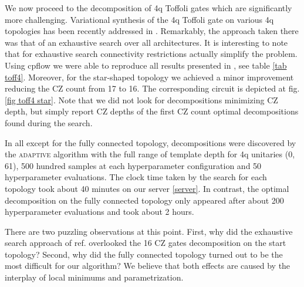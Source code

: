\documentclass[draft, amsfonts, amssymb, aps, nofootinbib, twocolumn]{revtex4-2}
\newcommand{\CZ}{CZ }
\newcommand{\cpflow}{\textrm {cpflow }}
\newcommand{\adaptive}{\textsc{adaptive }}
\begin{document}
We now proceed to the decomposition of 4q Toffoli gates which are significantly more challenging. Variational synthesis of the 4q Toffoli gate on various 4q topologies has been recently addressed in \cite{Nakanishi2021}. Remarkably, the approach taken there was that of an exhaustive search over all architectures. It is interesting to note that for exhaustive search connectivity restrictions actually simplify the problem. Using \cpflow we were able to reproduce all results presented in \cite{Nakanishi2021}, see table \ref{tab toff4}. Moreover, for the star-shaped topology we achieved a minor improvement reducing the \CZ count from 17 to 16. The corresponding circuit is depicted at fig.\ref{fig toff4 star}. Note that we did not look for decompositions minimizing \CZ depth, but simply report \CZ depths of the first \CZ count optimal decompositions found during the search.

In all except for the fully connected topology, decompositions were discovered by the \adaptive algorithm with the full range of template depth for 4q unitaries (0, 61), 500 hundred samples at each hyperparameter configuration and 50 hyperparameter evaluations. The clock time taken by the search for each topology took about 40 minutes on our server \ref{server}. In contrast, the optimal decomposition on the fully connected topology only appeared after about 200 hyperparameter evaluations and took about 2 hours.

There are two puzzling observations at this point. First, why did the exhaustive search approach of ref.\cite{Nakanishi2021} overlooked the 16 \CZ gates decomposition on the start topology? Second,  why did the fully connected topology turned out to be the most difficult for our algorithm?  We believe that both effects are caused by the interplay of local minimums and parametrization. 
\end{document}
